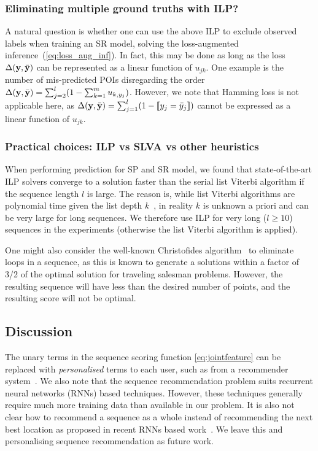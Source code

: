 \subsubsection{Eliminating multiple ground truths with ILP?}
A natural question is whether one can use the above ILP
to exclude observed labels when training an SR model,
\ie solving the loss-augmented inference~(\ref{eq:loss_aug_inf}).
In fact, this may be done
as long as the loss $\Delta(\mathbf{y},\bar{\mathbf{y}})$ can be represented as a linear function of $u_{jk}$.
One example is the number of mis-predicted POIs disregarding the order $\Delta(\mathbf{y}, \bar{\mathbf{y}}) = \sum_{j=2}^l (1 - \sum_{k=1}^m u_{k, y_j})$.
However, we note that Hamming loss %
is not applicable here,
as $\Delta(\mathbf{y},\bar{\mathbf{y}}) = \sum_{j=1}^l (1 - \llbracket y_j = \bar y_j \rrbracket)$
cannot be expressed as a linear function of $u_{jk}$.


\subsubsection{Practical choices: ILP vs SLVA vs other heuristics}
When performing prediction for SP and SR model, we found that state-of-the-art ILP solvers converge to a solution faster
than the serial list Viterbi algorithm if the sequence length $l$ is large.
The reason is, while list Viterbi algorithms are polynomial time given the list depth $k$~\cite{nilsson2001sequentially},
in reality $k$ is unknown a priori and can be very large for long sequences.
We therefore use ILP for very long ($l\ge10$) sequences in the experiments (otherwise the list Viterbi algorithm is applied).

One might also consider the well-known Christofides algorithm~\cite{christofides1976} to eliminate loops in a sequence, as this is known to generate a solutions within a factor of 3/2 of the optimal solution for traveling salesman problems. However, the resulting sequence will have less than the desired number of points, and the resulting score will not be optimal.


\subsection{Discussion}
The unary terms in the sequence scoring function \eqref{eq:jointfeature} can be replaced with {\em personalised} terms to each user, such as from a recommender system~\cite{Koren:2009,bpr09}. 
We also note that the sequence recommendation problem suits recurrent neural networks (RNNs) based techniques.
However, these techniques generally require much more training data than available in our problem.
It is also not clear how to recommend a sequence as a whole instead of recommending the next best location as proposed in recent RNNs based work~\cite{aaai16}.
We leave this and personalising sequence recommendation as future work.


